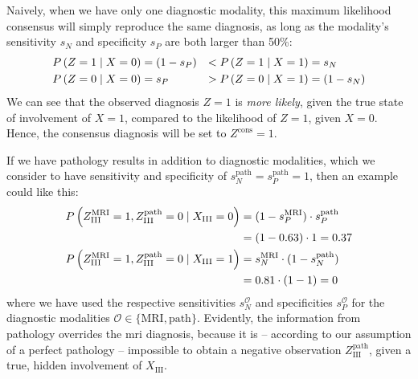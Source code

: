 \documentclass[\relativeRoot/main.tex]{subfiles}
\begin{document}
Naively, when we have only one diagnostic modality, this maximum likelihood consensus will simply reproduce the same diagnosis, as long as the modality's sensitivity $s_N$ and specificity $s_P$ are both larger than 50\%:
%
\begin{equation}
    \begin{aligned}
        P \left( Z = 1 \mid X = 0 \right) &= \left( 1 - s_P \right) &< P \left( Z = 1 \mid X = 1 \right) &= s_N \\
        P \left( Z = 0 \mid X = 0 \right) &= s_P &> P \left( Z = 0 \mid X = 1 \right) &= \left( 1 - s_N \right)
    \end{aligned}
\end{equation}
%
We can see that the observed diagnosis $Z=1$ is \emph{more likely}, given the true state of involvement of $X=1$, compared to the likelihood of $Z=1$, given $X=0$. Hence, the consensus diagnosis will be set to $Z^\text{cons} = 1$.

If we have pathology results in addition to diagnostic modalities, which we consider to have sensitivity and specificity of $s^\text{path}_N = s^\text{path}_P = 1$, then an example could like this:
%
\begin{equation}
    \begin{aligned}
        P \left( Z_\text{III}^\text{MRI} = 1, Z_\text{III}^\text{path} = 0 \mid X_\text{III} = 0 \right)
        &= (1 - s^\text{MRI}_P) \cdot s^\text{path}_P \\
        &= (1 - 0.63) \cdot 1 = 0.37 \\
        P \left( Z_\text{III}^\text{MRI} = 1, Z_\text{III}^\text{path} = 0 \mid X_\text{III} = 1 \right)
        &= s^\text{MRI}_N \cdot (1 - s^\text{path}_N) \\
        &= 0.81 \cdot (1 - 1) = 0
    \end{aligned}
\end{equation}
%
where we have used the respective sensitivities $s_N^\mathcal{O}$ and specificities $s_P^\mathcal{O}$ for the diagnostic modalities $\mathcal{O} \in \{ \text{MRI}, \text{path} \}$. Evidently, the information from pathology overrides the \gls{mri} diagnosis, because it is -- according to our assumption of a perfect pathology -- impossible to obtain a negative observation $Z_\text{III}^\text{path}$, given a true, hidden involvement of $X_\text{III}$.
\end{document}
